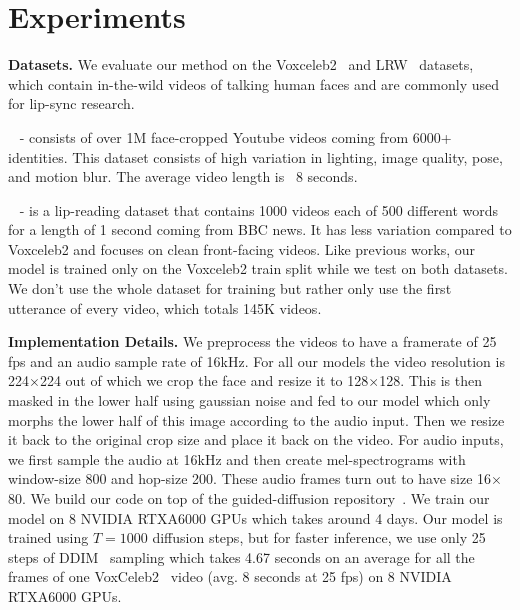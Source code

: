
\section{Experiments}\label{sec:exp}

\textbf{Datasets.} We evaluate our method on the Voxceleb2~\cite{voxceleb2} and LRW~\cite{lrw} datasets, which contain in-the-wild videos of talking human faces and are  commonly used for lip-sync research. 

~\cite{voxceleb2} - consists of over 1M face-cropped Youtube videos coming from 6000+ identities. This dataset consists of high variation in lighting, image quality, pose, and motion blur. The average video length is ~8 seconds.

~\cite{lrw} - is a lip-reading dataset that contains 1000 videos each of 500 different words for a length of 1 second coming from BBC news. It has less variation compared to Voxceleb2 and focuses on clean front-facing videos. 
Like previous works, our model is trained only on the Voxceleb2 train split while we test on both datasets. We don't use the whole dataset for training but rather only use the first utterance of every video, which totals 145K videos.  


\textbf{Implementation Details.} We preprocess the videos to have a framerate of 25 fps and an audio sample rate of 16kHz. For all our models the video resolution is 224$\times$224 out of which we crop the face and resize it to 128$\times$128. This is then masked in the lower half using gaussian noise and fed to our model which only morphs the lower half of this image according to the audio input. Then we resize it back to the original crop size and place it back on the video. For audio inputs, we first sample the audio at 16kHz and then create mel-spectrograms with window-size 800 and hop-size 200. These audio frames turn out to have size 16$\times$80. We build our code on top of the guided-diffusion repository~\cite{guided-diffusion}. %
We train our model on 8 NVIDIA RTXA6000 GPUs which takes around 4 days. Our model is trained using $T=1000$ diffusion steps, but for faster inference, we use only 25 steps of DDIM~\cite{ddim} sampling which takes 4.67 seconds on an average for all the frames of one VoxCeleb2~\cite{voxceleb2} video (avg. 8 seconds at 25 fps) on 8 NVIDIA RTXA6000 GPUs.


